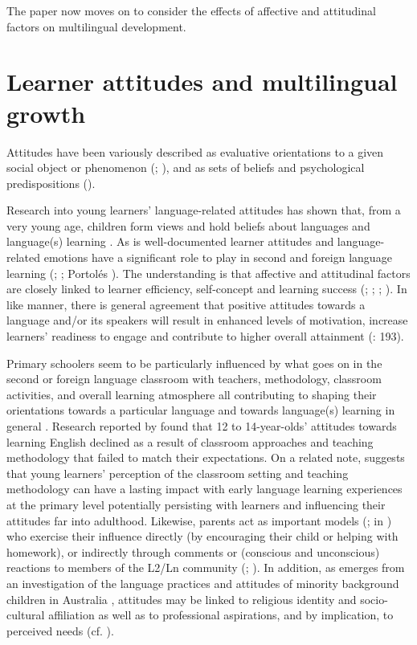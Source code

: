 \documentclass[output=paper]{../langscibook}
\begin{document}
The paper now moves on to consider the effects of affective and attitudinal factors on multilingual development.

\section{Learner attitudes and multilingual growth}


Attitudes have been variously described as evaluative orientations to a given social object or phenomenon (\citealt{Garret2010}; \citealt{Cenoz2004}), and as sets of beliefs and psychological predispositions (\citealt[124]{TodorDegi2016}). 

Research into young learners’ language-related attitudes has shown that, from a very young age, children form views and hold beliefs about languages and language(s) learning \citep{Munoz2014,NagyNikolov2009,Nikolov2009}. As is well-documented learner attitudes and language-related emotions have a significant role to play in second and foreign language learning (\citealt[3]{CourtneyEtAl2017}; \citealt[58]{Culhane2004}; Portolés \citealt[77]{Falomir2015}). The understanding is that affective and attitudinal factors are closely linked to learner efficiency, self-concept and learning success (\citealt{DornyeiEtAl2015}; \citealt[197]{MacIntyreGregersen2012}; \citealt{MacintyreEtAl2016}; \citealt{Wesely2012}). In like manner, there is general agreement that positive attitudes towards a language and/or its speakers will result in enhanced levels of motivation, increase learners’ readiness to engage and contribute to higher overall attainment (\citealt{MacIntyreGregersen2012}: 193).

Primary schoolers seem to be particularly influenced by what goes on in the second or foreign language classroom with teachers, methodology, classroom activities, and overall learning atmosphere all contributing to shaping their orientations towards a particular language and towards language(s) learning in general \citep{Nikolov1999}. Research reported by \citet[155]{Chambers1999} found that 12 to 14-year-olds’ attitudes towards learning English declined as a result of classroom approaches and teaching methodology that failed to match their expectations. On a related note, \citet[107]{Wesely2012} suggests that young learners’ perception of the classroom setting and teaching methodology can have a lasting impact with early language learning experiences at the primary level potentially persisting with learners and influencing their attitudes far into adulthood. Likewise, parents act as important models (\citealt[205]{Cenoz2004}; \citealt{Gardner1985} in \citealt{CsizerKormos2009}) who exercise their influence directly (by encouraging their child or helping with homework), or indirectly through comments or (conscious and unconscious) reactions to members of the L2/Ln community (\citealt[83]{CsizerKormos2009}; \citealt[347]{OtwinowskaDeAngelis2012}). In addition, as emerges from an investigation of the language practices and attitudes of minority background children in Australia \citep[64]{Bissoonauth2018}, attitudes may be linked to religious identity and socio-cultural affiliation as well as to professional aspirations, and by implication, to perceived needs (cf. \citealt{HerdinaJessner2002}).
\end{document}
